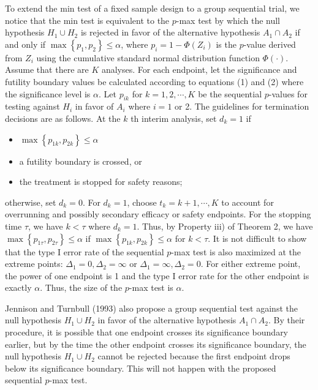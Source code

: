 \documentclass[10pt]{article}
\begin{document}
To extend the min test of a fixed sample design to a group sequential trial, we notice that the min test is equivalent to the $p$-max test by which the null hypothesis $H_{1} \cup H_{2}$ is rejected in favor of the alternative hypothesis $A_{1} \cap A_{2}$ if and only if $\max \left\{p_{1}, p_{2}\right\} \leq \alpha$, where $p_{i}=1-\Phi\left(Z_{i}\right)$ is the $p$-value derived from $Z_{i}$ using the cumulative standard normal distribution function $\Phi(\cdot)$. Assume that there are $K$ analyses. For each endpoint, let the significance and futility boundary values be calculated according to equations (1) and (2) where the significance level is $\alpha$. Let $p_{i k}$ for $k=1,2, \cdots, K$ be the sequential $p$-values for testing against $H_{i}$ in favor of $A_{i}$ where $i=1$ or 2. The guidelines for termination decisions are as follows. At the $k$ th interim analysis, set $d_{k}=1$ if

\begin{itemize}
  \item[(a)] $\max \left\{p_{1 k}, p_{2 k}\right\} \leq \alpha$
  \item[(b)] a futility boundary is crossed, or
  \item[(c)] the treatment is stopped for safety reasons;
\end{itemize}

otherwise, set $d_{k}=0$. For $d_{k}=1$, choose $t_{k}=k+1, \cdots, K$ to account for overrunning and possibly secondary efficacy or safety endpoints. For the stopping time $\tau$, we have $k<\tau$ where $d_{k}=1$. Thus, by Property iii) of Theorem 2, we have $\max \left\{p_{1 \tau}, p_{2 \tau}\right\} \leq \alpha$ if $\max \left\{p_{1 k}, p_{2 k}\right\} \leq \alpha$ for $k<\tau$. It is not difficult to show that the type I error rate of the sequential $p$-max test is also maximized at the extreme points: $\Delta_{1}=0, \Delta_{2}=\infty$ or $\Delta_{1}=\infty, \Delta_{2}=0$. For either extreme point, the power of one endpoint is 1 and the type I error rate for the other endpoint is exactly $\alpha$. Thus, the size of the $p$-max test is $\alpha$.

Jennison and Turnbull (1993) also propose a group sequential test against the null hypothesis $H_{1} \cup H_{2}$ in favor of the alternative hypothesis $A_{1} \cap A_{2}$. By their procedure, it is possible that one endpoint crosses its significance boundary earlier, but by the time the other endpoint crosses its significance boundary, the null hypothesis $H_{1} \cup H_{2}$ cannot be rejected because the first endpoint drops below its significance boundary. This will not happen with the proposed sequential $p$-max test.
\end{document}

